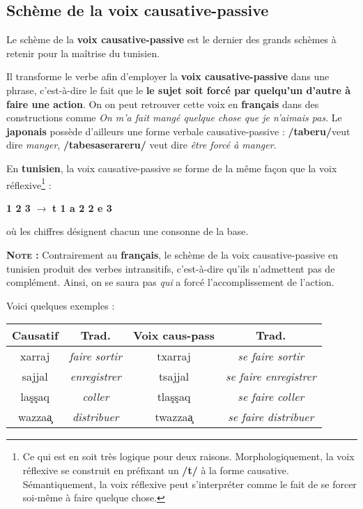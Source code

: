 \subsection{Schème de la voix causative-passive}
Le schème de la \textbf{voix causative-passive} est le dernier des grands schèmes à retenir pour la maîtrise du tunisien. 

Il transforme le verbe afin d'employer la \textbf{voix causative-passive} dans une phrase, c'est-à-dire le fait que le \textbf{le sujet soit forcé par quelqu'un d'autre à faire une action}. On on peut retrouver cette voix en \textbf{français} dans des constructions comme \textit{On m'a fait mangé quelque chose que je n'aimais pas}. Le \textbf{japonais} possède d'ailleurs une forme verbale causative-passive : \textbf{/taberu/}veut dire \textit{manger}, \textbf{/tabesaserareru/} veut dire \textit{être forcé à manger}.

En \textbf{tunisien}, la voix causative-passive se forme de la même façon que la voix réflexive\footnote{Ce qui est en soit très logique pour deux raisons. Morphologiquement, la voix réflexive se construit en préfixant un \textbf{/t/} à la forme causative. Sémantiquement, la voix réflexive peut s'interpréter comme le fait de se forcer soi-même à faire quelque chose.} : 

\begin{center}
    \Large{\textbf{1 2 3} $\rightarrow$ \textbf{t 1 a 2 2 e 3}}
\end{center}

où les chiffres désignent chacun une consonne de la base.

\textbf{\textsc{Note :}} Contrairement au \textbf{français}, le schème de la voix causative-passive en tunisien produit des verbes intransitifs, c'est-à-dire qu'ils n'admettent pas de complément. Ainsi, on se saura pas \textit{qui} a forcé l'accomplissement de l'action.


Voici quelques exemples : 

\begin{center}
\begin{tabular}{||c | c | c | c ||}
 \hline
  \textbf{Causatif} & \textbf{Trad.} & \textbf{Voix caus-pass} & \textbf{Trad.} \\
 \hline\hline
  xarraj & \textit{faire sortir} & txarraj & \textit{se faire sortir}\\
  \hline
  sajjal & \textit{enregistrer} & tsajjal & \textit{se faire enregistrer}\\
  \hline
  la\c{s}\c{s}aq & \textit{coller} & tla\c{s}\c{s}aq & \textit{se faire coller}\\
  \hline
  wazza\c{a} & \textit{distribuer} & twazza\c{a} & \textit{se faire distribuer}\\
  \hline
\end{tabular}    
\end{center}

